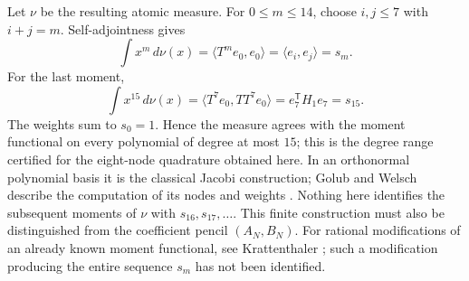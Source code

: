 Let $\nu$ be the resulting atomic measure. For $0\le m\le14$, choose
$i,j\le7$ with $i+j=m$. Self-adjointness gives
\[
 \int x^m\,d\nu(x)=\langle T^m e_0,e_0\rangle
 =\langle e_i,e_j\rangle=s_m.
\]
For the last moment,
\[
 \int x^{15}\,d\nu(x)=\langle T^7e_0,T T^7e_0\rangle
 =e_7^{\mathsf T}H_1e_7=s_{15}.
\]
The weights sum to $s_0=1$. Hence the measure agrees with the moment
functional on every polynomial of degree at most $15$; this is the
degree range certified for the eight-node quadrature obtained here.
In an orthonormal polynomial basis it is the classical Jacobi construction;
Golub and Welsch describe the computation of its nodes and weights
\cite[Sec.~2, (2.6); Sec.~4]{golubwelsch1969}.
Nothing here identifies the subsequent moments of $\nu$ with
$s_{16},s_{17},\ldots$. This finite construction must also be distinguished
from the coefficient pencil $(A_N,B_N)$.
For rational modifications of an already known moment functional, see
Krattenthaler \cite[Thm.~1; Sec.~6]{krattenthaler2021}; such a modification
producing the entire sequence $s_m$ has not been identified.

